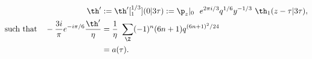 \begin{equation}
  \begin{split}
      \th'&:= \th'[^{1/3}_{1}](0|3\tau):= \p_z|_0 ~~e^{2\pi i/3}
  q^{1/6} y^{-1/3} ~\th_1(z-\tau|3\tau), \\
{\rm such ~that }\quad -{3i \over\pi} e^{-i\pi/6}{\th'
  \over\eta} &= {1\over\eta}~\sum_\Z (-1)^n (6n+1) q^{(6n+1)^2
  /24} \\ &= a(\tau).
  \end{split}
\end{equation}

